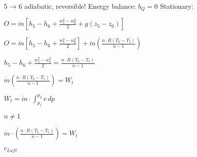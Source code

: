 5 → 6 adiabatic, reversible!  
Energy balance:  
\( b_Q = 0 \)  
Stationary:  

\( O = \dot{m} \left[ h_5 - h_6 + \frac{w_5^2 - w_6^2}{2} + g(z_5 - z_6) \right] \)  

\( O = \dot{m} \left[ h_5 - h_6 + \frac{w_5^2 - w_6^2}{2} \right] + \dot{m} \left( \frac{n \cdot R(T_6 - T_5)}{n-1} \right) \)  

\( h_5 - h_6 + \frac{w_5^2 - w_6^2}{2} = \frac{n \cdot R(T_6 - T_5)}{n-1} \)  

\( \dot{m} \left( \frac{n \cdot R(T_6 - T_5)}{n-1} \right) = W_t \)  

\( W_t = \dot{m} \cdot \int_{p_1}^{p_2} v \, dp \)  

\( n \neq 1 \)  

\( \dot{m} \cdot \left( \frac{n \cdot R(T_6 - T_5)}{n-1} \right) = W_t \)  

\( c_{Luft} \)